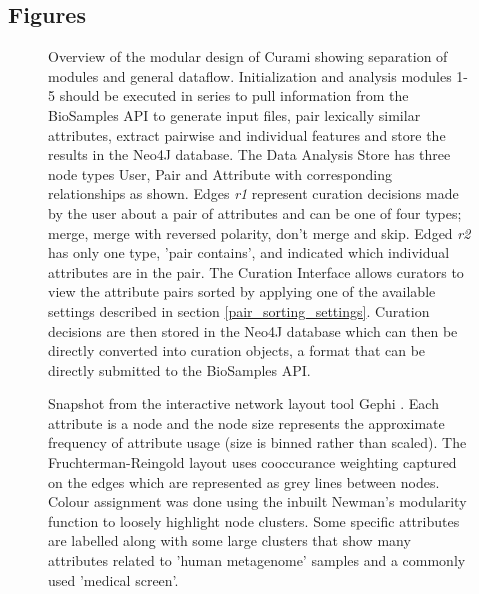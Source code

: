 \documentclass{bmcart}
\begin{document}
\begin{backmatter}

\section*{Figures}
  \begin{figure}[h!]
  \caption{
      Overview of the modular design of Curami showing separation of modules and general dataflow. Initialization and analysis modules 1-5 should be executed in series to pull information from the BioSamples API to generate input files, pair lexically similar attributes, extract pairwise and individual features and store the results in the Neo4J database. The Data Analysis Store has three node types User, Pair and Attribute with corresponding relationships as shown. Edges \textit{r1} represent curation decisions made by the user about a pair of attributes and can be one of four types; merge, merge with reversed polarity, don't merge and skip. Edged \textit{r2} has only one type, 'pair contains', and indicated which individual attributes are in the pair. The Curation Interface allows curators to view the attribute pairs sorted by applying one of the available settings described in section \ref{pair_sorting_settings}. Curation decisions are then stored in the Neo4J database which can then be directly converted into curation objects, a format that can be directly submitted to the BioSamples API.}
\label{fig:workflow}
\end{figure}

  \begin{figure}[h!]
  \caption{ 
  Snapshot from the interactive network layout tool Gephi \cite{bastian2009gephi}. Each attribute is a node and the node size represents the approximate frequency of attribute usage (size is binned rather than scaled). The Fruchterman-Reingold layout \cite{fruchterman1991graph} uses cooccurance weighting captured on the edges which are represented as grey lines between nodes. Colour assignment was done using the inbuilt Newman's modularity function \cite{newman2006modularity} to loosely highlight node clusters. Some specific attributes  are labelled along with some large clusters that show many attributes related to 'human metagenome' samples and a commonly used 'medical screen'.
  }
\label{fig:gephi}
\end{figure}



\end{backmatter}
\end{document}
